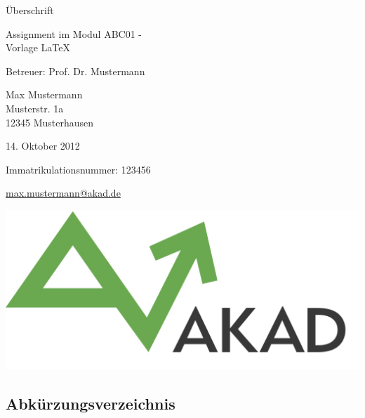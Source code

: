 \documentclass[a4paper,12pt]{article}
\begin{document}
\begin{center}
\thispagestyle{empty}
\vspace{9cm}

\Huge{Überschrift}
\vspace{1cm}
\onehalfspacing

\Large{Assignment im Modul ABC01 - \\ Vorlage \LaTeX{}}

\vspace{1cm}
\Large{Betreuer: Prof. Dr. Mustermann \\}
\normalsize
\vspace{2cm}

Max Mustermann\\Musterstr. 1a\\12345 Musterhausen
\\
\vspace{2cm}

14. Oktober 2012

Immatrikulationsnummer: 123456

\href{mailto:max.mustermann@akad.de}{max.mustermann@akad.de}
\vspace{3cm}

\includegraphics[scale=0.35]{akad_logo.png}

\end{center}

\clearpage

\normalsize


\begin{spacing}{1.0} %
\newpage
\tableofcontents %
\newpage
\listoffigures %
\newpage
\listoftables %
\newpage
\section*{Abkürzungsverzeichnis}
\begin{acronym}[ABK]
\end{acronym}
\end{spacing} 
\end{document}
